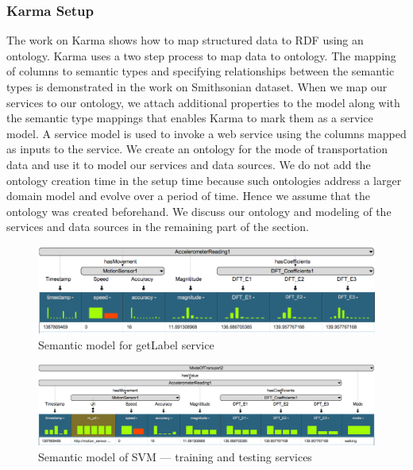 \subsubsection{Karma Setup} 
The work on Karma\cite{knoblock12:eswc} shows how to map structured data to RDF using an ontology. Karma uses a two step process to map data to ontology. The mapping of columns to semantic types and specifying relationships between the semantic types is demonstrated in the work on Smithsonian dataset\cite{szekely14:ijhac}. When we map our services to our ontology, we attach additional properties to the model along with the semantic type mappings that enables Karma to mark them as a service model. A service model is used to invoke a web service using the columns mapped as inputs to the service. We create an ontology for the mode of transportation data and use it to model our services and data sources. We do not add the ontology creation time in the setup time because such ontologies address a larger domain model and evolve over a period of time. Hence we assume that the ontology was created beforehand. We discuss our ontology and modeling of the services and data sources in the remaining part of the section.

\begin{figure}[ht!]
\centering
\includegraphics[width=180mm]{img/getLabelService}
\caption{Semantic model for getLabel service\label{fig:imgGetLabelService}}
\end{figure}

\begin{figure}[bp]
\centering
\includegraphics[width=180mm]{img/svmService}
\caption{Semantic model of SVM --- training and testing services\label{fig:svmService}}
\end{figure}

